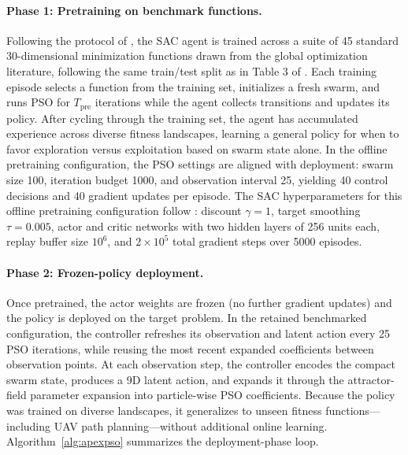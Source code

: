 \documentclass[final,5p,times]{elsarticle}
\begin{document}
\paragraph{Phase 1: Pretraining on benchmark functions.}
Following the protocol of \cite{vonEschwege2024Soft}, the SAC agent is trained across a suite of 45 standard 30-dimensional minimization functions drawn from the global optimization literature, following the same train/test split as in Table 3 of \cite{vonEschwege2024Soft}.
Each training episode selects a function from the training set, initializes a fresh swarm, and runs PSO for $T_{\text{pre}}$ iterations while the agent collects transitions and updates its policy.
After cycling through the training set, the agent has accumulated experience across diverse fitness landscapes, learning a general policy for when to favor exploration versus exploitation based on swarm state alone.
In the offline pretraining configuration, the PSO settings are aligned with deployment: swarm size 100, iteration budget 1000, and observation interval 25, yielding 40 control decisions and 40 gradient updates per episode.
The SAC hyperparameters for this offline pretraining configuration follow \cite{vonEschwege2024Soft}: discount $\gamma=1$, target smoothing $\tau=0.005$, actor and critic networks with two hidden layers of 256 units each, replay buffer size $10^6$, and $2\times10^5$ total gradient steps over 5000 episodes.

\paragraph{Phase 2: Frozen-policy deployment.}
Once pretrained, the actor weights are frozen (no further gradient updates) and the policy is deployed on the target problem.
In the retained benchmarked configuration, the controller refreshes its observation and latent action every 25 PSO iterations, while reusing the most recent expanded coefficients between observation points.
At each observation step, the controller encodes the compact swarm state, produces a 9D latent action, and expands it through the attractor-field parameter expansion into particle-wise PSO coefficients.
Because the policy was trained on diverse landscapes, it generalizes to unseen fitness functions---including UAV path planning---without additional online learning.
Algorithm~\ref{alg:apexpso} summarizes the deployment-phase loop.
\end{document}
